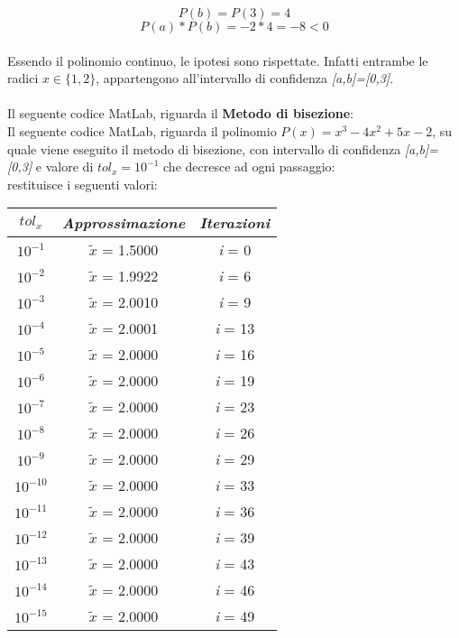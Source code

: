 \[
P(b) = P(3) = 4
\]
\[
P(a)*P(b) = -2 * 4 = -8 < 0
\]\\
Essendo il polinomio continuo, le ipotesi sono rispettate. Infatti entrambe le radici $x \in \{1,2\}$, appartengono all'intervallo di confidenza \textit{[a,b]=[0,3]}.\\\\
Il seguente codice MatLab, riguarda il \textbf{Metodo di bisezione}:\\

Il seguente codice MatLab, riguarda il polinomio $P(x) = x^3-4x^2+5x-2$, su quale viene eseguito il metodo di bisezione, con intervallo di confidenza \textit{[a,b]=[0,3]} e valore di $tol_x=10^{-1}$ che decresce ad ogni passaggio:\\

restituisce i seguenti valori:\\
\begin{center}
\begin{tabular}{|c|c|c|}
\hline
$tol_x$ & \textit{Approssimazione} & \textit{Iterazioni} \\
\hline
    $10^{-1}$ & $\tilde{x}$ = 1.5000 & \textit{i} = 0\\
    $10^{-2}$ & $\tilde{x}$ = 1.9922 & \textit{i} = 6\\
    $10^{-3}$ & $\tilde{x}$ = 2.0010 & \textit{i} = 9\\
    $10^{-4}$ & $\tilde{x}$ = 2.0001 & \textit{i} = 13\\
    $10^{-5}$ & $\tilde{x}$ = 2.0000 & \textit{i} = 16\\
    $10^{-6}$ & $\tilde{x}$ = 2.0000 & \textit{i} = 19\\
    $10^{-7}$ & $\tilde{x}$ = 2.0000 & \textit{i} = 23\\
    $10^{-8}$ & $\tilde{x}$ = 2.0000 & \textit{i} = 26\\
    $10^{-9}$ & $\tilde{x}$ = 2.0000 & \textit{i} = 29\\
    $10^{-10}$ & $\tilde{x}$ = 2.0000 & \textit{i} = 33\\
    $10^{-11}$ & $\tilde{x}$ = 2.0000 & \textit{i} = 36\\
    $10^{-12}$ & $\tilde{x}$ = 2.0000 & \textit{i} = 39\\
    $10^{-13}$ & $\tilde{x}$ = 2.0000 & \textit{i} = 43\\
    $10^{-14}$ & $\tilde{x}$ = 2.0000 & \textit{i} = 46\\
    $10^{-15}$ & $\tilde{x}$ = 2.0000 & \textit{i} = 49\\
\hline
\end{tabular}
\end{center}
